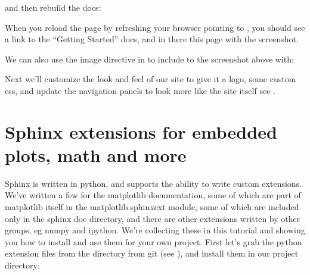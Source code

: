 \documentclass[letterpaper,10pt,english]{sphinxmanual}
\begin{document}
\begin{sphinxVerbatim}[commandchars=\\\{\}]

 
    

\end{sphinxVerbatim}

and then rebuild the docs:

\begin{sphinxVerbatim}[commandchars=\\\{\}]
 
 
\end{sphinxVerbatim}

When you reload the page by refreshing your browser pointing to
, you should see a link to the
“Getting Started” docs, and in there this page with the screenshot.

We can also use the image directive in  to include to the screenshot above
with:

\begin{sphinxVerbatim}[commandchars=\\\{\}]
 
\end{sphinxVerbatim}

Next we’ll customize the look and feel of our site to give it a logo,
some custom css, and update the navigation panels to look more like
the  site itself \textendash{} see
.


\chapter{Sphinx extensions for embedded plots, math and more}
\label{\detokenize{chapter2:sphinx-extensions-for-embedded-plots-math-and-more}}\label{\detokenize{chapter2:extensions}}\label{\detokenize{chapter2::doc}}
Sphinx is written in python, and supports the ability to write custom
extensions.  We’ve written a few for the matplotlib documentation,
some of which are part of matplotlib itself in the
matplotlib.sphinxext module, some of which are included only in the
sphinx doc directory, and there are other extensions written by other
groups, eg numpy and ipython.  We’re collecting these in this tutorial
and showing you how to install and use them for your own project.
First let’s grab the python extension files from the 
directory from git (see {\hyperref[\detokenize{chapter1:fetching-the-data}]{}}), and install them in
our  project  directory:
\end{document}
